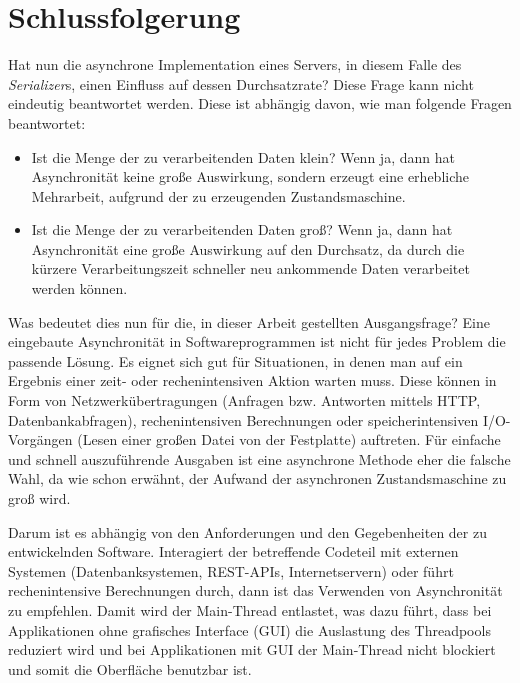 \section{Schlussfolgerung}
\label{sec:schlussfolgerung}

Hat nun die asynchrone Implementation eines Servers, in diesem Falle des \textit{Serializer}s, einen Einfluss auf dessen Durchsatzrate? Diese Frage kann nicht eindeutig beantwortet werden. Diese ist abhängig davon, wie man folgende Fragen beantwortet:
\begin{itemize}
    \item Ist die Menge der zu verarbeitenden Daten klein? Wenn ja, dann hat Asynchronität keine große Auswirkung, sondern erzeugt eine erhebliche Mehrarbeit, aufgrund der zu erzeugenden Zustandsmaschine.
    \item Ist die Menge der zu verarbeitenden Daten groß? Wenn ja, dann hat Asynchronität eine große Auswirkung auf den Durchsatz, da durch die kürzere Verarbeitungszeit schneller neu ankommende Daten verarbeitet werden können.
\end{itemize}

Was bedeutet dies nun für die, in dieser Arbeit gestellten Ausgangsfrage? Eine eingebaute Asynchronität in Softwareprogrammen ist nicht für jedes Problem die passende Lösung. Es eignet sich gut für Situationen, in denen man auf ein Ergebnis einer zeit- oder rechenintensiven Aktion warten muss. Diese können in Form von Netzwerkübertragungen (Anfragen bzw. Antworten mittels HTTP, Datenbankabfragen), rechenintensiven Berechnungen oder speicherintensiven I/O-Vorgängen (Lesen einer großen Datei von der Festplatte) auftreten. Für einfache und schnell auszuführende Ausgaben ist eine asynchrone Methode eher die falsche Wahl, da wie schon erwähnt, der Aufwand der asynchronen Zustandsmaschine zu groß wird.

Darum ist es abhängig von den Anforderungen und den Gegebenheiten der zu entwickelnden Software. Interagiert der betreffende Codeteil mit externen Systemen (Datenbanksystemen, REST-APIs, Internetservern) oder führt rechenintensive Berechnungen durch, dann ist das Verwenden von Asynchronität zu empfehlen. Damit wird der Main-Thread entlastet, was dazu führt, dass bei Applikationen ohne grafisches Interface (GUI) die Auslastung des Threadpools reduziert wird und bei Applikationen mit GUI der Main-Thread nicht blockiert und somit die Oberfläche benutzbar ist.

